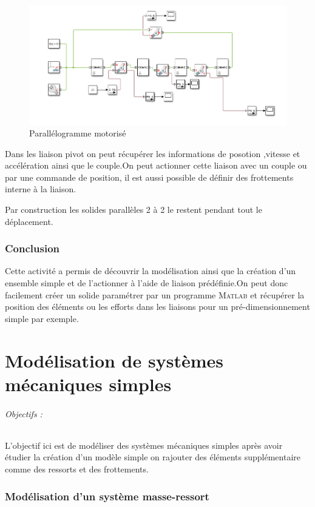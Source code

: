 \documentclass[12pt,a4paper]{article}
\begin{document}
\begin{figure}[h!]
\centering
\includegraphics[scale=0.8]{motorise.png}
\caption{Parallélogramme motorisé}
\label{motorise_parallélograme}
\end{figure}
 
Dans les liaison pivot on peut récupérer les informations de posotion ,vitesse et accélération ainsi que le couple.On peut actionner cette liaison avec un couple ou par une commande de position, il est aussi possible de définir des frottements interne à la liaison.

Par construction les solides parallèles 2 à 2 le restent pendant tout le déplacement.

\section{Conclusion}
Cette activité a permis de découvrir la modélisation ainsi que la création d'un ensemble simple et de l'actionner à l'aide de liaison prédéfinie.On peut donc facilement créer un solide paramétrer par un programme \textsc{Matlab} et récupérer la position des éléments ou les efforts dans les liaisons pour un pré-dimensionnement simple par exemple.

\part{Modélisation de systèmes mécaniques simples}


\paragraph*{Objectifs :}
L'objectif ici est de modéliser des systèmes mécaniques simples après avoir étudier la création d'un modèle simple on rajouter des éléments supplémentaire comme des ressorts et des frottements. 
\section{Modélisation d'un système masse-ressort}
\end{document}
